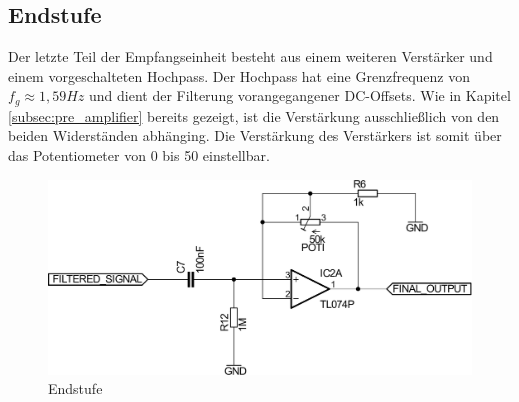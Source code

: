 \subsection{Endstufe}
Der letzte Teil der Empfangseinheit besteht aus einem weiteren Verstärker und einem vorgeschalteten Hochpass. Der Hochpass hat eine Grenzfrequenz von $f_{g} \approx 1,59Hz$ und dient der Filterung vorangegangener DC-Offsets. Wie in Kapitel \ref{subsec:pre_amplifier} bereits gezeigt, ist die Verstärkung ausschließlich von den beiden Widerständen abhänging. Die Verstärkung des Verstärkers ist somit über das Potentiometer von 0 bis 50 einstellbar.
\begin{figure}[H]
	\centering
	\includegraphics[scale=0.5]{gfx/post_amplifier.pdf}
	\caption{Endstufe}
\end{figure}